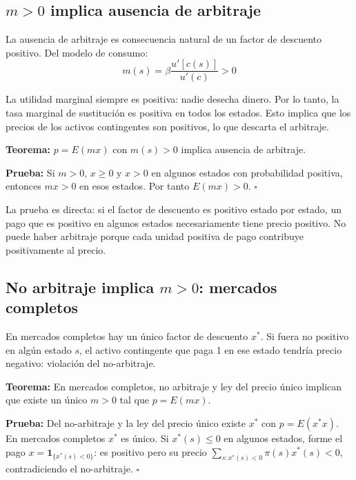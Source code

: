 \documentclass[12pt]{article}
\begin{document}
\subsection{$m > 0$ implica ausencia de arbitraje}

La ausencia de arbitraje es consecuencia natural de un factor de descuento positivo. Del modelo de consumo:
\begin{equation}
    m(s) = \beta \frac{u'[c(s)]}{u'(c)} > 0
\end{equation}

\begin{intuicionmat}
La utilidad marginal siempre es positiva: nadie desecha dinero. Por lo tanto, la tasa marginal de sustituci\'on es positiva en todos los estados. Esto implica que los precios de los activos contingentes son positivos, lo que descarta el arbitraje.
\end{intuicionmat}

\textbf{Teorema:} $p = E(mx)$ con $m(s) > 0$ implica ausencia de arbitraje.

\textbf{Prueba:} Si $m > 0$, $x \geq 0$ y $x > 0$ en algunos estados con probabilidad positiva, entonces $mx > 0$ en esos estados. Por tanto $E(mx) > 0$. $\square$

\begin{intuicion}
La prueba es directa: si el factor de descuento es positivo estado por estado, un pago que es positivo en algunos estados necesariamente tiene precio positivo. No puede haber arbitraje porque cada unidad positiva de pago contribuye positivamente al precio.
\end{intuicion}

\subsection{No arbitraje implica $m > 0$: mercados completos}

En mercados completos hay un \'unico factor de descuento $x^*$. Si fuera no positivo en alg\'un estado $s$, el activo contingente que paga 1 en ese estado tendr\'ia precio negativo: violaci\'on del no-arbitraje.

\textbf{Teorema:} En mercados completos, no arbitraje y ley del precio \'unico implican que existe un \'unico $m > 0$ tal que $p = E(mx)$.

\textbf{Prueba:} Del no-arbitraje y la ley del precio \'unico existe $x^*$ con $p = E(x^* x)$. En mercados completos $x^*$ es \'unico. Si $x^*(s) \leq 0$ en algunos estados, forme el pago $x = \mathbf{1}_{\{x^*(s)<0\}}$: es positivo pero su precio $\sum_{s: x^*(s)<0} \pi(s) x^*(s) < 0$, contradiciendo el no-arbitraje. $\square$
\end{document}
